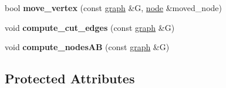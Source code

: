 \begin{DoxyCompactItemize}
bool {\bfseries move\+\_\+vertex} (const \mbox{\hyperlink{classgraph}{graph}} \&G, \mbox{\hyperlink{classnode}{node}} \&moved\+\_\+node)
\item 
\mbox{\label{classratio__cut__partition_a5588508593940888323121b340b40477}} 
void {\bfseries compute\+\_\+cut\+\_\+edges} (const \mbox{\hyperlink{classgraph}{graph}} \&G)
\item 
\mbox{\label{classratio__cut__partition_a39341e2459485a3f5367081ff208e769}} 
void {\bfseries compute\+\_\+nodes\+AB} (const \mbox{\hyperlink{classgraph}{graph}} \&G)
\end{DoxyCompactItemize}
\subsection*{Protected Attributes}
